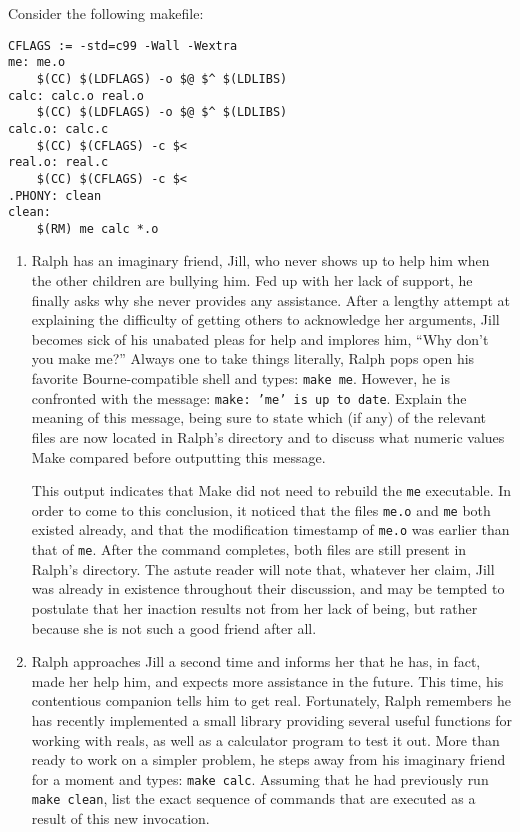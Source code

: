Consider the following makefile:
\begin{lstlisting}
CFLAGS := -std=c99 -Wall -Wextra
me: me.o
    $(CC) $(LDFLAGS) -o $@ $^ $(LDLIBS)
calc: calc.o real.o
	$(CC) $(LDFLAGS) -o $@ $^ $(LDLIBS)
calc.o: calc.c
	$(CC) $(CFLAGS) -c $<
real.o: real.c
	$(CC) $(CFLAGS) -c $<
.PHONY: clean
clean:
	$(RM) me calc *.o
\end{lstlisting}

\begin{enumerate}
\item
Ralph has an imaginary friend, Jill, who never shows up to help him when the other children are bullying him.
Fed up with her lack of support, he finally asks why she never provides any assistance.
After a lengthy attempt at explaining the difficulty of getting others to acknowledge her arguments, Jill becomes sick of his unabated pleas for help and implores him, ``Why don't you make me?''
Always one to take things literally, Ralph pops open his favorite Bourne-compatible shell and types: \texttt{make me}.
However, he is confronted with the message: \texttt{make:\ 'me' is up to date}.
Explain the meaning of this message, being sure to state which (if any) of the relevant files are now located in Ralph's directory and to discuss what numeric values Make compared before outputting this message.

\begin{answer}
This output indicates that Make did not need to rebuild the \texttt{me} executable.
In order to come to this conclusion, it noticed that the files \texttt{me.o} and \texttt{me} both existed already, and that the modification timestamp of \texttt{me.o} was earlier than that of \texttt{me}.
After the command completes, both files are still present in Ralph's directory.
The astute reader will note that, whatever her claim, Jill was already in existence throughout their discussion, and may be tempted to postulate that her inaction results not from her lack of being, but rather because she is not such a good friend after all.
\end{answer}

\item
Ralph approaches Jill a second time and informs her that he has, in fact, made her help him, and expects more assistance in the future.
This time, his contentious companion tells him to get real.
Fortunately, Ralph remembers he has recently implemented a small library providing several useful functions for working with reals, as well as a calculator program to test it out.
More than ready to work on a simpler problem, he steps away from his imaginary friend for a moment and types: \texttt{make calc}.
Assuming that he had previously run \texttt{make clean}, list the exact sequence of commands that are executed as a result of this new invocation.


\end{enumerate}
